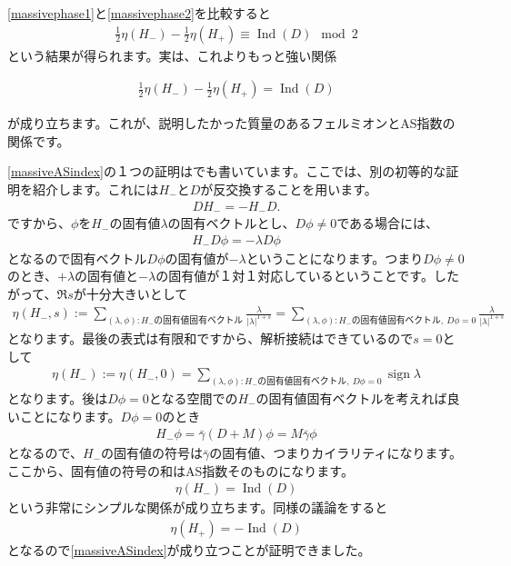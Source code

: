 \documentclass[paper=a4, fontsize=12pt, line_length=16cm, number_of_lines=33,dvipdfmx]{jlreq}
\numberwithin{equation}{section}
\newcommand{\gammab}{\bar{\gamma}}
\DeclareMathOperator{\sign}{\mathrm{sign}}
\DeclareMathOperator{\Ind}{\mathrm{Ind}}
\newcommand{\Hm}{H_{-}}
\newcommand{\Hp}{H_{+}}
\newenvironment{important}{\begin{tcolorbox}[
  colback = white,
  colframe = red!35,
  boxrule = 2mm,
  fonttitle = \bfseries,
  after = \noindent] }{\end{tcolorbox}}
\begin{document}
\eqref{massivephase1}と\eqref{massivephase2}を比較すると
\begin{align}
  \frac12 \eta(\Hm)-\frac12 \eta(\Hp)\equiv \Ind(D)\mod 2
\end{align}
という結果が得られます。実は、これよりもっと強い関係
\begin{important}
  \begin{align}
    \frac12 \eta(\Hm)-\frac12 \eta(\Hp)=\Ind(D)\label{massiveASindex}
  \end{align}    
\end{important}
が成り立ちます。これが、説明したかった質量のあるフェルミオンとAS指数の関係です。

\eqref{massiveASindex}の１つの証明は\cite{Fukaya:2019qlf}でも書いています。ここでは、別の初等的な証明を紹介します。これには$\Hm$と$D$が反交換することを用います。
\begin{align}
  D\Hm=-\Hm D.
\end{align}
ですから、$\phi$を$\Hm$の固有値$\lambda$の固有ベクトルとし、$D\phi\ne 0$である場合には、
\begin{align}
  \Hm D\phi=-\lambda D\phi
\end{align}
となるので固有ベクトル$D\phi$の固有値が$-\lambda$ということになります。つまり$D\phi\ne 0$のとき、$+\lambda$の固有値と$-\lambda$の固有値が１対１対応しているということです。したがって、$\Re s$が十分大きいとして
\begin{align}
  \eta(\Hm,s):=\sum_{(\lambda,\phi):\Hm\text{の固有値固有ベクトル}}\frac{\lambda}{|\lambda|^{1+s}}
  =\sum_{(\lambda,\phi):\Hm\text{の固有値固有ベクトル},\ D\phi=0}
  \frac{\lambda}{|\lambda|^{1+s}}
\end{align}
となります。最後の表式は有限和ですから、解析接続はできているので$s=0$として
\begin{align}
  \eta(\Hm):=\eta(\Hm,0)=\sum_{(\lambda,\phi):\Hm\text{の固有値固有ベクトル},\ D\phi=0}\sign \lambda
\end{align}
となります。後は$D\phi=0$となる空間での$\Hm$の固有値固有ベクトルを考えれば良いことになります。$D\phi=0$のとき
\begin{align}
  \Hm \phi=\gammab(D+M)\phi=M\gammab \phi
\end{align}
となるので、$\Hm$の固有値の符号は$\gammab$の固有値、つまりカイラリティになります。ここから、固有値の符号の和はAS指数そのものになります。
\begin{align}
  \eta(\Hm)=\Ind(D)
\end{align}
という非常にシンプルな関係が成り立ちます。同様の議論をすると
\begin{align}
  \eta(\Hp)=-\Ind(D)
\end{align}
となるので\eqref{massiveASindex}が成り立つことが証明できました。
\end{document}
